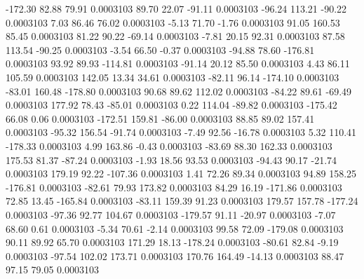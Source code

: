      -172.30       82.88       79.91     0.0003103
       89.70       22.07      -91.11     0.0003103
      -96.24      113.21      -90.22     0.0003103
        7.03       86.46       76.02     0.0003103
       -5.13       71.70       -1.76     0.0003103
       91.05      160.53       85.45     0.0003103
       81.22       90.22      -69.14     0.0003103
       -7.81       20.15       92.31     0.0003103
       87.58      113.54      -90.25     0.0003103
       -3.54       66.50       -0.37     0.0003103
      -94.88       78.60     -176.81     0.0003103
       93.92       89.93     -114.81     0.0003103
      -91.14       20.12       85.50     0.0003103
        4.43       86.11      105.59     0.0003103
      142.05       13.34       34.61     0.0003103
      -82.11       96.14     -174.10     0.0003103
      -83.01      160.48     -178.80     0.0003103
       90.68       89.62      112.02     0.0003103
      -84.22       89.61      -69.49     0.0003103
      177.92       78.43      -85.01     0.0003103
        0.22      114.04      -89.82     0.0003103
     -175.42       66.08        0.06     0.0003103
     -172.51      159.81      -86.00     0.0003103
       88.85       89.02      157.41     0.0003103
      -95.32      156.54      -91.74     0.0003103
       -7.49       92.56      -16.78     0.0003103
        5.32      110.41     -178.33     0.0003103
        4.99      163.86       -0.43     0.0003103
      -83.69       88.30      162.33     0.0003103
      175.53       81.37      -87.24     0.0003103
       -1.93       18.56       93.53     0.0003103
      -94.43       90.17      -21.74     0.0003103
      179.19       92.22     -107.36     0.0003103
        1.41       72.26       89.34     0.0003103
       94.89      158.25     -176.81     0.0003103
      -82.61       79.93      173.82     0.0003103
       84.29       16.19     -171.86     0.0003103
       72.85       13.45     -165.84     0.0003103
      -83.11      159.39       91.23     0.0003103
      179.57      157.78     -177.24     0.0003103
      -97.36       92.77      104.67     0.0003103
     -179.57       91.11      -20.97     0.0003103
       -7.07       68.60        0.61     0.0003103
       -5.34       70.61       -2.14     0.0003103
       99.58       72.09     -179.08     0.0003103
       90.11       89.92       65.70     0.0003103
      171.29       18.13     -178.24     0.0003103
      -80.61       82.84       -9.19     0.0003103
      -97.54      102.02      173.71     0.0003103
      170.76      164.49      -14.13     0.0003103
       88.47       97.15       79.05     0.0003103
